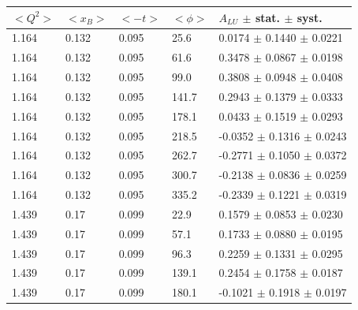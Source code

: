 \begin{table}[!h]
   \begin{center}
      \begin{tabular}{||l|l|l|l|l||}
         \hline
 $<Q^{2}>$ & $<x_{B}>$ & $<-t>$ & $<\phi>$ & $A_{LU}$ $\pm$ stat. $\pm$ syst.\\
         \hline

  1.164 & 0.132 & 0.095 & 25.6  &  0.0174 $\pm$ 0.1440 $\pm$ 0.0221 \\                                            
  1.164 & 0.132 & 0.095 & 61.6  &  0.3478 $\pm$ 0.0867 $\pm$ 0.0198 \\                                            
  1.164 & 0.132 & 0.095 & 99.0  &  0.3808 $\pm$ 0.0948 $\pm$ 0.0408 \\                                            
  1.164 & 0.132 & 0.095 & 141.7 &  0.2943 $\pm$ 0.1379 $\pm$ 0.0333 \\                                            
  1.164 & 0.132 & 0.095 & 178.1 &  0.0433 $\pm$ 0.1519 $\pm$ 0.0293 \\                                            
  1.164 & 0.132 & 0.095 & 218.5 & -0.0352 $\pm$ 0.1316 $\pm$ 0.0243 \\                                            
  1.164 & 0.132 & 0.095 & 262.7 & -0.2771 $\pm$ 0.1050 $\pm$ 0.0372 \\                                            
  1.164 & 0.132 & 0.095 & 300.7 & -0.2138 $\pm$ 0.0836 $\pm$ 0.0259 \\                                            
  1.164 & 0.132 & 0.095 & 335.2 & -0.2339 $\pm$ 0.1221 $\pm$ 0.0319 \\                                            
   \hline                                                                                                         
  1.439 & 0.17 & 0.099 &  22.9  &  0.1579 $\pm$ 0.0853 $\pm$ 0.0230 \\                                            
  1.439 & 0.17 & 0.099 &  57.1  &  0.1733 $\pm$ 0.0880 $\pm$ 0.0195 \\                                            
  1.439 & 0.17 & 0.099 &  96.3  &  0.2259 $\pm$ 0.1331 $\pm$ 0.0295 \\                                            
  1.439 & 0.17 & 0.099 &  139.1 &  0.2454 $\pm$ 0.1758 $\pm$ 0.0187 \\                                            
  1.439 & 0.17 & 0.099 &  180.1 & -0.1021 $\pm$ 0.1918 $\pm$ 0.0197 \\                                            

\end{tabular}
\end{center}
\end{table}
